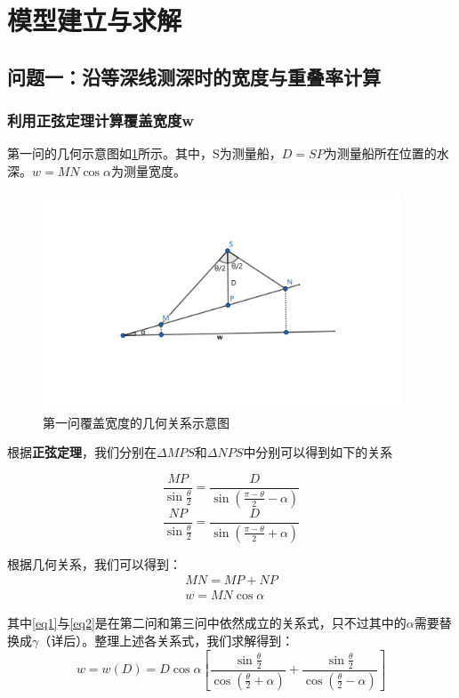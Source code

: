\documentclass{article}
\begin{document}
\section{模型建立与求解}
\subsection{问题一：沿等深线测深时的宽度与重叠率计算}
\subsubsection{利用正弦定理计算覆盖宽度w}
	\par 第一问的几何示意图如\ref{pro1Geo}所示。其中，S为测量船，$D=SP$为测量船所在位置的水深。$w=MN\cos\alpha$为测量宽度。
	
	\begin{figure}[H]
		\centering  %
		\includegraphics[width=0.95\textwidth]{问题一//问题一几何关系示意图}
		\caption{第一问覆盖宽度的几何关系示意图}
		\label{pro1Geo}
	\end{figure}
	\par 根据\textbf{正弦定理}，我们分别在$\Delta MPS$和$\Delta NPS$中分别可以得到如下的关系
	
	\[
		\frac{MP}{\sin\frac{\theta}{2}} = \frac{D}{\sin(\frac{\pi-\theta}{2}-\alpha)}    
	\]
	\[
	\frac{NP}{\sin\frac{\theta}{2}} = \frac{D}{\sin(\frac{\pi-\theta}{2}+\alpha)}   \]
	

	\par 根据几何关系，我们可以得到：
	\begin{align}
		MN = MP + NP \label{eq1}  \\
		w = MN\cos\alpha  \label{eq2} 
	\end{align}
	
	\par 其中\eqref{eq1}与\eqref{eq2}是在第二问和第三问中依然成立的关系式，只不过其中的$\alpha$需要替换成$\gamma$（详后）。整理上述各关系式，我们求解得到：
	\begin{equation}
		w = w(D) = D\cos\alpha\left[\frac{\sin\frac{\theta}{2}}{\cos(\frac{\theta}{2}+\alpha)}  +  \frac{\sin\frac{\theta}{2}}{\cos(\frac{\theta}{2}-\alpha)}\right] \label{eq3}
	\end{equation}
\end{document}
